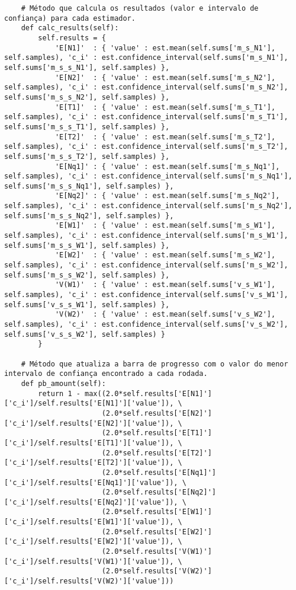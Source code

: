 \begin{verbatim}
    # Método que calcula os resultados (valor e intervalo de confiança) para cada estimador.
    def calc_results(self):
        self.results = {
            'E[N1]'  : { 'value' : est.mean(self.sums['m_s_N1'], self.samples), 'c_i' : est.confidence_interval(self.sums['m_s_N1'], self.sums['m_s_s_N1'], self.samples) },
            'E[N2]'  : { 'value' : est.mean(self.sums['m_s_N2'], self.samples), 'c_i' : est.confidence_interval(self.sums['m_s_N2'], self.sums['m_s_s_N2'], self.samples) },
            'E[T1]'  : { 'value' : est.mean(self.sums['m_s_T1'], self.samples), 'c_i' : est.confidence_interval(self.sums['m_s_T1'], self.sums['m_s_s_T1'], self.samples) },
            'E[T2]'  : { 'value' : est.mean(self.sums['m_s_T2'], self.samples), 'c_i' : est.confidence_interval(self.sums['m_s_T2'], self.sums['m_s_s_T2'], self.samples) },
            'E[Nq1]' : { 'value' : est.mean(self.sums['m_s_Nq1'], self.samples), 'c_i' : est.confidence_interval(self.sums['m_s_Nq1'], self.sums['m_s_s_Nq1'], self.samples) },
            'E[Nq2]' : { 'value' : est.mean(self.sums['m_s_Nq2'], self.samples), 'c_i' : est.confidence_interval(self.sums['m_s_Nq2'], self.sums['m_s_s_Nq2'], self.samples) },
            'E[W1]'  : { 'value' : est.mean(self.sums['m_s_W1'], self.samples), 'c_i' : est.confidence_interval(self.sums['m_s_W1'], self.sums['m_s_s_W1'], self.samples) },
            'E[W2]'  : { 'value' : est.mean(self.sums['m_s_W2'], self.samples), 'c_i' : est.confidence_interval(self.sums['m_s_W2'], self.sums['m_s_s_W2'], self.samples) },
            'V(W1)'  : { 'value' : est.mean(self.sums['v_s_W1'], self.samples), 'c_i' : est.confidence_interval(self.sums['v_s_W1'], self.sums['v_s_s_W1'], self.samples) },
            'V(W2)'  : { 'value' : est.mean(self.sums['v_s_W2'], self.samples), 'c_i' : est.confidence_interval(self.sums['v_s_W2'], self.sums['v_s_s_W2'], self.samples) }
        }
    
    # Método que atualiza a barra de progresso com o valor do menor intervalo de confiança encontrado a cada rodada.
    def pb_amount(self):
        return 1 - max((2.0*self.results['E[N1]']['c_i']/self.results['E[N1]']['value']), \
                       (2.0*self.results['E[N2]']['c_i']/self.results['E[N2]']['value']), \
                       (2.0*self.results['E[T1]']['c_i']/self.results['E[T1]']['value']), \
                       (2.0*self.results['E[T2]']['c_i']/self.results['E[T2]']['value']), \
                       (2.0*self.results['E[Nq1]']['c_i']/self.results['E[Nq1]']['value']), \
                       (2.0*self.results['E[Nq2]']['c_i']/self.results['E[Nq2]']['value']), \
                       (2.0*self.results['E[W1]']['c_i']/self.results['E[W1]']['value']), \
                       (2.0*self.results['E[W2]']['c_i']/self.results['E[W2]']['value']), \
                       (2.0*self.results['V(W1)']['c_i']/self.results['V(W1)']['value']), \
                       (2.0*self.results['V(W2)']['c_i']/self.results['V(W2)']['value']))
            

\end{verbatim}
